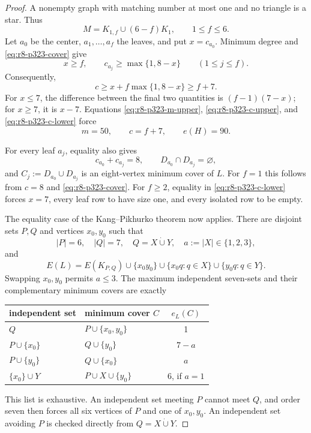 \documentclass[11pt,reqno,a4paper]{amsart}
\theoremstyle{definition}
\theoremstyle{remark}
\begin{document}
\begin{proof}
A nonempty graph with matching number at most one and no triangle is a
star. Thus
\[
 M=K_{1,f}\cup(6-f)K_1,
 \qquad1\leq f\leq6.
\]
Let $a_0$ be the center, $a_1,\ldots,a_f$ the leaves, and put
$x=c_{a_0}$. Minimum degree and \eqref{eq:r8-p323-cover} give
\[
 x\geq f,
 \qquad c_{a_j}\geq\max\{1,8-x\}\qquad(1\leq j\leq f).
\]
Consequently,
\begin{equation}\label{eq:r8-p323-c-lower}
 c\geq x+f\max\{1,8-x\}\geq f+7.
\end{equation}
For $x\leq7$, the difference between the final two quantities is
$(f-1)(7-x)$; for $x\geq7$, it is $x-7$. Equations
\eqref{eq:r8-p323-m-upper}, \eqref{eq:r8-p323-c-upper}, and
\eqref{eq:r8-p323-c-lower} force
\begin{equation}\label{eq:r8-p323-equality}
 m=50,\qquad c=f+7,\qquad e(H)=90.
\end{equation}

For every leaf $a_j$, equality also gives
\[
 c_{a_0}+c_{a_j}=8,
 \qquad D_{a_0}\cap D_{a_j}=\varnothing,
\]
and $C_j:=D_{a_0}\cup D_{a_j}$ is an eight-vertex minimum cover of
$L$. For $f=1$ this follows from $c=8$ and
\eqref{eq:r8-p323-cover}. For $f\geq2$, equality in
\eqref{eq:r8-p323-c-lower} forces $x=7$, every leaf row to have size
one, and every isolated row to be empty.

The equality case of the Kang--Pikhurko theorem now applies. There are
disjoint sets $P,Q$ and vertices $x_0,y_0$ such that
\[
 |P|=6,
 \quad |Q|=7,
 \quad Q=X\mathbin{\dot\cup}Y,
 \quad a:=|X|\in\{1,2,3\},
\]
and
\[
 E(L)=E(K_{P,Q})\cup\{x_0y_0\}
 \cup\{x_0q:q\in X\}\cup\{y_0q:q\in Y\}.
\]
Swapping $x_0,y_0$ permits $a\leq3$. The maximum independent
seven-sets and their complementary minimum covers are exactly
\begin{center}
\begin{tabular}{p{}p{}c}
\toprule
independent set&minimum cover $C$&$e_L(C)$\\
\midrule
$Q$&$P\cup\{x_0,y_0\}$&1\\
$P\cup\{x_0\}$&$Q\cup\{y_0\}$&$7-a$\\
$P\cup\{y_0\}$&$Q\cup\{x_0\}$&$a$\\
$\{x_0\}\cup Y$&$P\cup X\cup\{y_0\}$&6, if $a=1$\\
\bottomrule
\end{tabular}
\end{center}
This list is exhaustive. An independent set meeting $P$ cannot meet
$Q$, and order seven then forces all six vertices of $P$ and one of
$x_0,y_0$. An independent set avoiding $P$ is checked directly from
$Q=X\mathbin{\dot\cup}Y$.


\end{proof}
\end{document}
